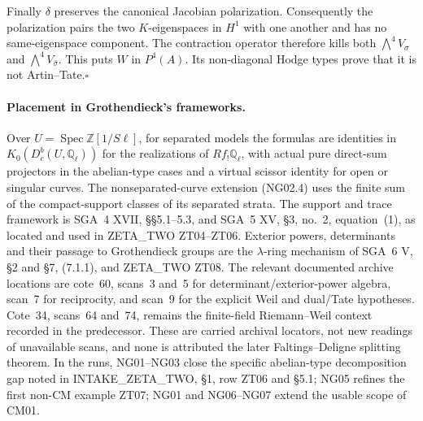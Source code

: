 Finally $\delta$ preserves the canonical Jacobian polarization.
Consequently the polarization pairs the two $K$-eigenspaces in
$H^1$ with one another and has no same-eigenspace component.  The
contraction operator therefore kills both
$\bigwedge^4 V_\sigma$ and $\bigwedge^4 V_{\bar\sigma}$.
This puts $W$ in $P^4(A)$.  Its non-diagonal Hodge types prove that
it is not Artin--Tate.\hfill$\square$

\paragraph{Placement in Grothendieck's frameworks.}
Over $U=\operatorname{Spec}\mathbb Z[1/S\ell]$, for separated models
the formulas are
identities in $K_0(D_c^b(U,\mathbb Q_\ell))$ for the realizations of
$Rf_!\mathbb Q_\ell$, with actual pure direct-sum projectors in the
abelian-type cases and a virtual scissor identity for open or singular
curves.  The nonseparated-curve extension (NG02.4) uses the finite sum
of the compact-support classes of its separated strata.
The support and trace framework is SGA~4 XVII,
\S\S5.1--5.3, and SGA~5 XV, \S3, no.~2, equation~(1), as located and
used in ZETA\_TWO ZT04--ZT06.  Exterior powers, determinants and
their passage to Grothendieck groups are the $\lambda$-ring mechanism
of SGA~6 V, \S2 and \S7, (7.1.1), and ZETA\_TWO ZT08.
The relevant documented archive locations are cote~60, scans~3 and~5
for determinant/exterior-power algebra, scan~7 for reciprocity, and
scan~9 for the explicit Weil and dual/Tate hypotheses.  Cote~34,
scans~64 and~74, remains the finite-field Riemann--Weil context
recorded in the predecessor.  These are carried archival locators,
not new readings of unavailable scans, and none is attributed the
later Faltings--Deligne splitting theorem.  In the runs, NG01--NG03
close the specific abelian-type decomposition gap noted in
INTAKE\_ZETA\_TWO, \S1, row ZT06 and \S5.1; NG05 refines the first
non-CM example ZT07; NG01 and NG06--NG07 extend the usable scope of CM01.
